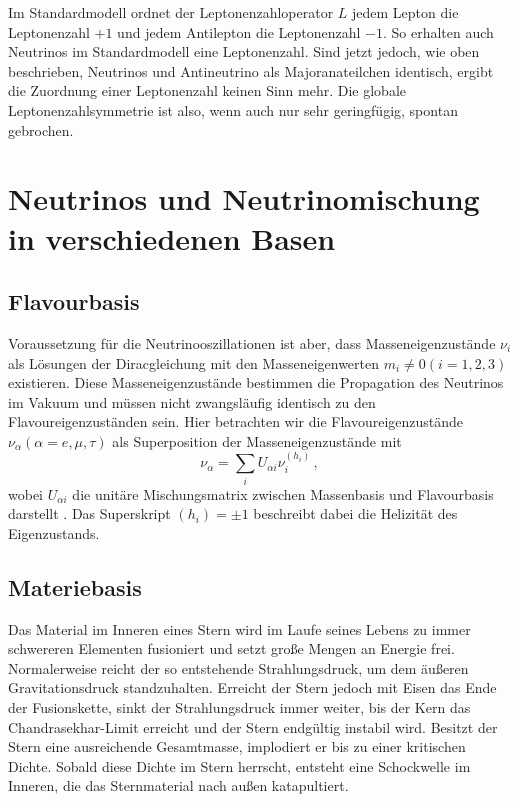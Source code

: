 Im Standardmodell ordnet der Leptonenzahloperator $L$ jedem Lepton die Leptonenzahl $+1$ und jedem Antilepton die Leptonenzahl $-1$.
So erhalten auch Neutrinos im Standardmodell eine Leptonenzahl. 
Sind jetzt jedoch, wie oben beschrieben, Neutrinos und Antineutrino als Majoranateilchen identisch, ergibt die Zuordnung einer Leptonenzahl keinen Sinn mehr.
Die globale Leptonenzahlsymmetrie ist also, wenn auch nur sehr geringfügig, spontan gebrochen.

\section{Neutrinos und Neutrinomischung in verschiedenen Basen}
\label{sec:neutrinobasen}

\subsection{Flavourbasis} %
\label{subsec:flavourbasis}
Voraussetzung für die Neutrinooszillationen ist aber, dass Masseneigenzustände $\nu_i$ als Lösungen der Diracgleichung mit den Masseneigenwerten $m_i \neq 0 (i = 1, 2, 3)$ existieren.
Diese Masseneigenzustände bestimmen die Propagation des Neutrinos im Vakuum und müssen nicht zwangsläufig identisch zu den Flavoureigenzuständen sein.
Hier betrachten wir die Flavoureigenzustände $\nu_\alpha (\alpha = e, \mu, \tau)$ als Superposition der Masseneigenzustände mit
\begin{equation}
    \nu_\alpha = \sum_i U_{\alpha i} \nu^{(h_i)}_i \,,
    \label{eq:flavourbasis}
\end{equation}
wobei $U_{\alpha i}$ die unitäre Mischungsmatrix zwischen Massenbasis und Flavourbasis darstellt \cite[Kap. 2.1]{oberauer}.
Das Superskript $(h_i) = \pm 1$ beschreibt dabei die Helizität des Eigenzustands.

\subsection{Materiebasis} %
\label{subsec:materiebasis}

Das Material im Inneren eines Stern wird im Laufe seines Lebens zu immer schwereren Elementen fusioniert und setzt große Mengen an Energie frei.
Normalerweise reicht der so entstehende Strahlungsdruck, um dem äußeren Gravitationsdruck standzuhalten.
Erreicht der Stern jedoch mit Eisen das Ende der Fusionskette, sinkt der Strahlungsdruck immer weiter, bis der Kern das Chandrasekhar-Limit erreicht und der Stern endgültig instabil wird.
Besitzt der Stern eine ausreichende Gesamtmasse, implodiert er bis zu einer kritischen Dichte.
Sobald diese Dichte im Stern herrscht, entsteht eine Schockwelle im Inneren, die das Sternmaterial nach außen katapultiert.


